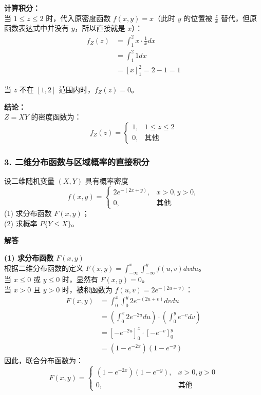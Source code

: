 \textbf{计算积分：}\\
当 $1 \le z \le 2$ 时，代入原密度函数 $f(x,y) = x$（此时 $y$ 的位置被 $\frac{z}{x}$ 替代，但原函数表达式中并没有 $y$，所以直接就是 $x$）：
$$ 
\begin{aligned}
f_Z(z) &= \int_{1}^{2} x \cdot \frac{1}{x} dx \\
&= \int_{1}^{2} 1 dx \\
&= [x]_1^2 = 2 - 1 = 1
\end{aligned}
$$

当 $z$ 不在 $[1, 2]$ 范围内时，$f_Z(z) = 0$。

\textbf{结论：}\\
$Z = XY$ 的密度函数为：
$$ f_Z(z) = \begin{cases} 1, & 1 \le z \le 2 \\ 0, & \text{其他} \end{cases} $$

\vspace{1.5em}
\subsubsection*{3. 二维分布函数与区域概率的直接积分}

\begin{例题}[求分布函数与区域概率]
	设二维随机变量 $(X,Y)$ 具有概率密度
	$$ f(x,y) = \begin{cases} 2e^{-(2x+y)}, & x>0, y>0, \\ 0, & \text{其他.} \end{cases} $$
	(1) 求分布函数 $F(x,y)$；\\
	(2) 求概率 $P\{Y \le X\}$。
\end{例题}

\textbf{解答}\quad

\textbf{(1) 求分布函数 $F(x,y)$}\\
根据二维分布函数的定义 $F(x,y) = \int_{-\infty}^{x} \int_{-\infty}^{y} f(u,v) dv du$。\\
当 $x \le 0$ 或 $y \le 0$ 时，显然有 $F(x,y) = 0$。\\
当 $x > 0$ 且 $y > 0$ 时，被积函数为 $f(u,v) = 2e^{-(2u+v)}$：
$$ 
\begin{aligned}
F(x,y) &= \int_{0}^{x} \int_{0}^{y} 2e^{-(2u+v)} dv du \\
&= \left( \int_{0}^{x} 2e^{-2u} du \right) \cdot \left( \int_{0}^{y} e^{-v} dv \right) \\
&= \left[ -e^{-2u} \right]_{0}^{x} \cdot \left[ -e^{-v} \right]_{0}^{y} \\
&= (1 - e^{-2x})(1 - e^{-y})
\end{aligned}
$$
因此，联合分布函数为：
$$ F(x,y) = \begin{cases} (1 - e^{-2x})(1 - e^{-y}), & x>0, y>0 \\ 0, & \text{其他} \end{cases} $$

